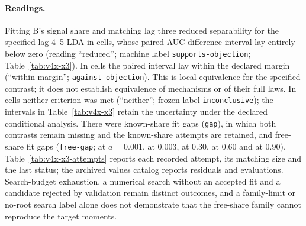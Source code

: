 \paragraph{Readings.}
Fitting B's signal share and matching lag three reduced separability for the specified lag-4--5 LDA in  cells, whose paired AUC-difference interval lay entirely below zero (reading ``reduced''; machine label \texttt{supports-objection}; Table~\ref{tab:v4x-x3}).
In  cells the paired interval lay within the declared margin (``within margin''; \texttt{against-objection}). This is local equivalence for the specified contrast; it does not establish equivalence of mechanisms or of their full laws.
In  cells neither criterion was met (``neither''; frozen label \texttt{inconclusive}); the intervals in Table~\ref{tab:v4x-x3} retain the uncertainty under the declared conditional analysis.
There were  known-share fit gaps (\texttt{gap}), in which both contrasts remain missing and the known-share attempts are retained, and  free-share fit gaps (\texttt{free-gap};  at $a=0.001$,  at 0.003,  at 0.30,  at 0.60 and  at 0.90). Table~\ref{tab:v4x-x3-attempts} reports each recorded attempt, its matching size and the last status; the archived values catalog reports residuals and evaluations. Search-budget exhaustion, a numerical search without an accepted fit and a candidate rejected by validation remain distinct outcomes, and a family-limit or no-root search label alone does not demonstrate that the free-share family cannot reproduce the target moments.
